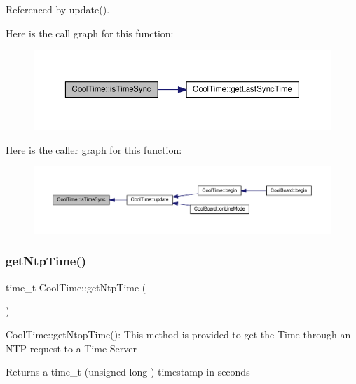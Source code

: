 Referenced by update().

Here is the call graph for this function\+:
\nopagebreak
\begin{figure}[H]
\begin{center}
\leavevmode
\includegraphics[width=350pt]{d6/d49/class_cool_time_a5ae038a4498602b189f76a10bf02adf8_cgraph}
\end{center}
\end{figure}
Here is the caller graph for this function\+:
\nopagebreak
\begin{figure}[H]
\begin{center}
\leavevmode
\includegraphics[width=350pt]{d6/d49/class_cool_time_a5ae038a4498602b189f76a10bf02adf8_icgraph}
\end{center}
\end{figure}
\mbox{\label{class_cool_time_a41fbbbfd651c2079f54d4b2911e4c705}} 
\subsubsection{\texorpdfstring{get\+Ntp\+Time()}{getNtpTime()}}
{\footnotesize\ttfamily time\+\_\+t Cool\+Time\+::get\+Ntp\+Time (\begin{DoxyParamCaption}{ }\end{DoxyParamCaption})}

Cool\+Time\+::get\+Ntop\+Time()\+: This method is provided to get the Time through an N\+TP request to a Time Server

\begin{DoxyReturn}{Returns}
a time\+\_\+t (unsigned long ) timestamp in seconds 
\end{DoxyReturn}


